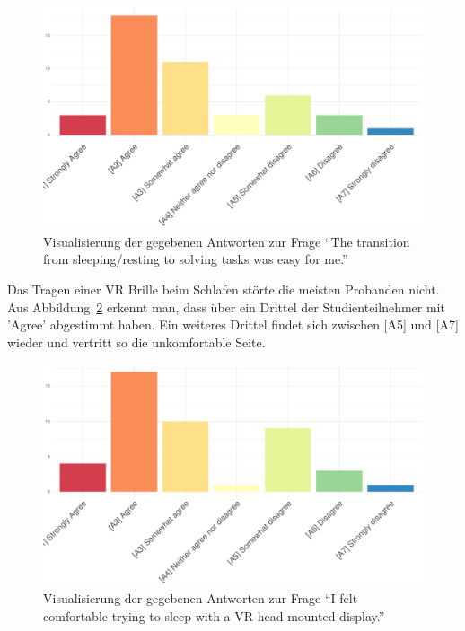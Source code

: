 \begin{figure}[H]
	\centering
	\includegraphics[width=\textwidth]{./_StudyResults/transitionEasy}
	\caption{Visualisierung der gegebenen Antworten zur Frage "`The transition from sleeping/resting to solving tasks was easy for me."'}
	\label{fig:transitionEasy}
\end{figure}

Das Tragen einer VR Brille beim Schlafen störte die meisten Probanden nicht. Aus Abbildung~\ref{fig:comfortableHeadset} erkennt man, dass über ein Drittel der Studienteilnehmer mit 'Agree' abgestimmt haben. Ein weiteres Drittel findet sich zwischen [A5] und [A7] wieder und vertritt so die unkomfortable Seite. 

\begin{figure}[H]
	\centering
	\includegraphics[width=\textwidth]{./_StudyResults/comfortableHeadset}
	\caption{Visualisierung der gegebenen Antworten zur Frage "`I felt comfortable trying to sleep with a VR head mounted display."'}
	\label{fig:comfortableHeadset}
\end{figure}

